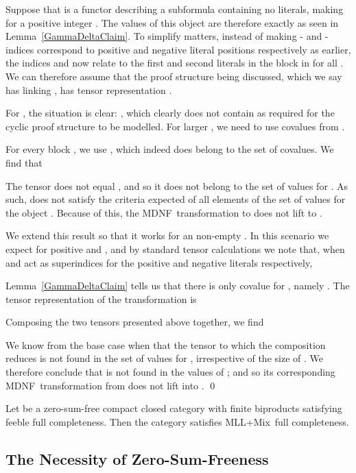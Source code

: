 \documentclass{LMCS}
\theoremstyle{plain}\newtheorem*{cLm}{Claim}
\newcommand{\mllmix}{MLL+Mix} \newcommand{\GRel}{\mathbf{GRel}}
\newcommand{\p}{} \newcommand{\N}{\mathbb{N}}
\begin{document}
    \p Suppose that  is a functor describing a subformula containing no literals, making  for a positive integer . The values of this object are therefore exactly as seen in Lemma~\ref{GammaDeltaClaim}. To simplify matters, instead of making - and -indices correspond to positive and negative literal positions respectively as earlier, the indices  and  now relate to the first and second literals in the  block in  for all . We can therefore assume that the proof structure being discussed, which we say has linking , has tensor representation .
    
    \p For , the situation is clear: , which clearly does not contain  as required for the cyclic proof structure to be modelled. For larger , we need to use covalues from .
    
    For every block , we use , which indeed does belong to the set of covalues. We find that
    
    The tensor  does not equal , and so it does not belong to the set of values for . As such,  does not satisfy the criteria expected of all elements of the set of values for the object . Because of this, the MDNF~transformation to  does not lift to .
    
    \p We extend this result so that it works for an non-empty . In this scenario we expect  for positive  and , and by standard tensor calculations we note that, when  and  act as superindices for the positive and negative literals respectively,
    
    
    Lemma~\ref{GammaDeltaClaim} tells us that there is only covalue for , namely . The tensor representation of the transformation is
    
    Composing the two tensors presented above together, we find
    
    
    We know from the base case when  that the tensor to which the composition reduces is not found in the set of values for , irrespective of the size of . We therefore conclude that  is not found in the values of ; and so its corresponding MDNF~transformation from  does not lift into . \qed
    
    \begin{thm}\label{mixfcomp}
    Let  be a zero-sum-free compact closed category with finite biproducts satisfying feeble full completeness. Then the category  satisfies \mllmix~full completeness.
    \end{thm}
    
    \subsection{The Necessity of Zero-Sum-Freeness}
    
\end{document}
